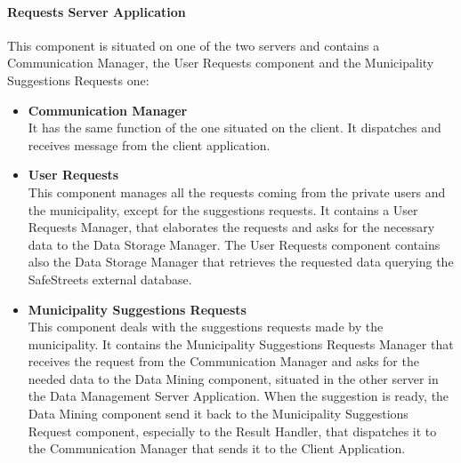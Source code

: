 \documentclass[titlepage]{article}
\begin{document}
\paragraph{\textbf{Requests Server Application}}
This component is situated on one of the two servers and contains a Communication Manager, the User Requests component and the Municipality Suggestions Requests one:
\begin{itemize}
\item \textbf{Communication Manager}\\
It has the same function of the one situated on the client. It dispatches and receives message from the client application.
\item \textbf{User Requests}\\
This component manages all the requests coming from the private users and the municipality, except for the suggestions requests. It contains a User Requests Manager, that elaborates the requests and asks for the necessary data to the Data Storage Manager. The User Requests component contains also the Data Storage Manager that retrieves the requested data querying the SafeStreets external database.
\item \textbf{Municipality Suggestions Requests}\\
This component deals with the suggestions requests made by the municipality. It contains the Municipality Suggestions Requests Manager that receives the request from the Communication Manager and asks for the needed data to the Data Mining component, situated in the other server in the Data Management Server Application. When the suggestion is ready, the Data Mining component send it back to the Municipality Suggestions Request component, especially to the Result Handler, that dispatches it to the Communication Manager that sends it to the Client Application.
\end{itemize}
\end{document}

